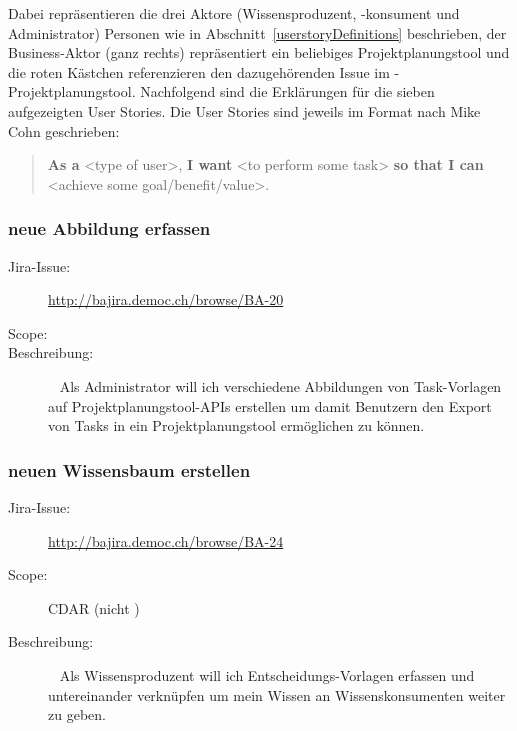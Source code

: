 		Dabei repräsentieren die drei Aktore (Wissensproduzent, -konsument und Administrator) Personen wie in Abschnitt~\ref{userstoryDefinitions} beschrieben,
		der Business-Aktor (ganz rechts) repräsentiert ein beliebiges Projektplanungstool und die roten Kästchen referenzieren den dazugehörenden Issue im \eeppi-Projektplanungstool.
		Nachfolgend sind die Erklärungen für die sieben aufgezeigten User Stories.
		Die User Stories sind jeweils im Format nach Mike Cohn\cite{jonathan_rasmusson_agile_2012} geschrieben:
		\begin{quote}
			\textbf{As a} <type of user>,\newline
			\textbf{I want} <to perform some task>\newline
			\textbf{so that I can} <achieve some goal/benefit/value>.
		\end{quote}
		
	\subsubsection{neue Abbildung erfassen}
		\begin{description}
			\item[Jira-Issue:] \url{http://bajira.democ.ch/browse/BA-20}
			\item[Scope:] \eeppi
			\item[Beschreibung:]\ \newline
				Als Administrator\newline
				will ich verschiedene Abbildungen von Task-Vorlagen auf Projektplanungstool-APIs erstellen\newline
				um damit Benutzern den Export von Tasks in ein Projektplanungstool ermöglichen zu können.
		\end{description}

	\subsubsection{neuen Wissensbaum erstellen}
		\begin{description}
			\item[Jira-Issue:] \url{http://bajira.democ.ch/browse/BA-24}
			\item[Scope:] CDAR (nicht \eeppi)
			\item[Beschreibung:]\ \newline
				Als Wissensproduzent\newline
				will ich Entscheidungs-Vorlagen erfassen und untereinander verknüpfen\newline
				um mein Wissen an Wissenskonsumenten weiter zu geben.
		\end{description}

